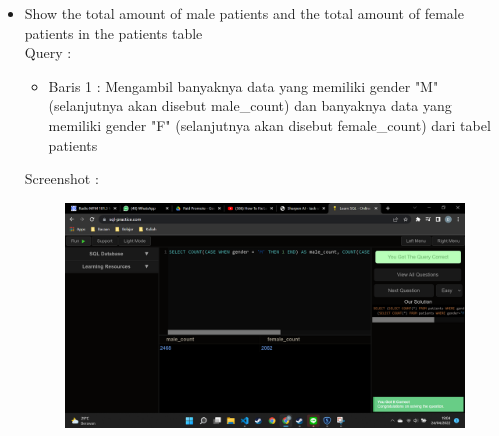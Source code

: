 \documentclass[]{article}
\begin{document}
\begin{itemize}
        \item Show the total amount of male patients and the total amount of female patients in the patients table
        \\Query :
        
        \begin{itemize}
            \item Baris 1 : Mengambil banyaknya data yang memiliki gender "M" (selanjutnya akan disebut male\_count) dan banyaknya data yang memiliki gender "F" (selanjutnya akan disebut female\_count) dari tabel patients 
        \end{itemize}
        Screenshot :
        \begin{figure}[h]
            \includegraphics[scale=0.3]{./Screenshot/Medium-6.png}
            \centering
        \end{figure}


\end{itemize}
\end{document}
